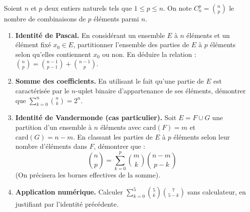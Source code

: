 \documentclass[11pt]{article}
\begin{document}
\begin{exercice}
Soient $n$ et $p$ deux entiers naturels tels que $1 \le p \le n$. On note $C_n^p = \binom{n}{p}$ le nombre de combinaisons de $p$ éléments parmi $n$.
\begin{enumerate}
    \item \textbf{Identité de Pascal.} En considérant un ensemble $E$ à $n$ éléments et un élément fixé $x_0 \in E$, partitionner l'ensemble des parties de $E$ à $p$ éléments selon qu'elles contiennent $x_0$ ou non. En déduire la relation : $\binom{n}{p} = \binom{n-1}{p-1} + \binom{n-1}{p}$.
    \item \textbf{Somme des coefficients.} En utilisant le fait qu'une partie de $E$ est caractérisée par le $n$-uplet binaire d'appartenance de ses éléments, démontrer que $\sum_{k=0}^{n} \binom{n}{k} = 2^n$.
    \item \textbf{Identité de Vandermonde (cas particulier).} Soit $E = F \cup G$ une partition d'un ensemble à $n$ éléments avec $\text{card}(F)=m$ et $\text{card}(G)=n-m$. En classant les parties de $E$ à $p$ éléments selon leur nombre d'éléments dans $F$, démontrer que :
    \[ \binom{n}{p} = \sum_{k=0}^{p} \binom{m}{k}\binom{n-m}{p-k} \]
    (On précisera les bornes effectives de la somme).
    \item \textbf{Application numérique.} Calculer $\sum_{k=0}^{5} \binom{5}{k}\binom{7}{5-k}$ sans calculateur, en justifiant par l'identité précédente.
\end{enumerate}
\end{exercice}
\end{document}
